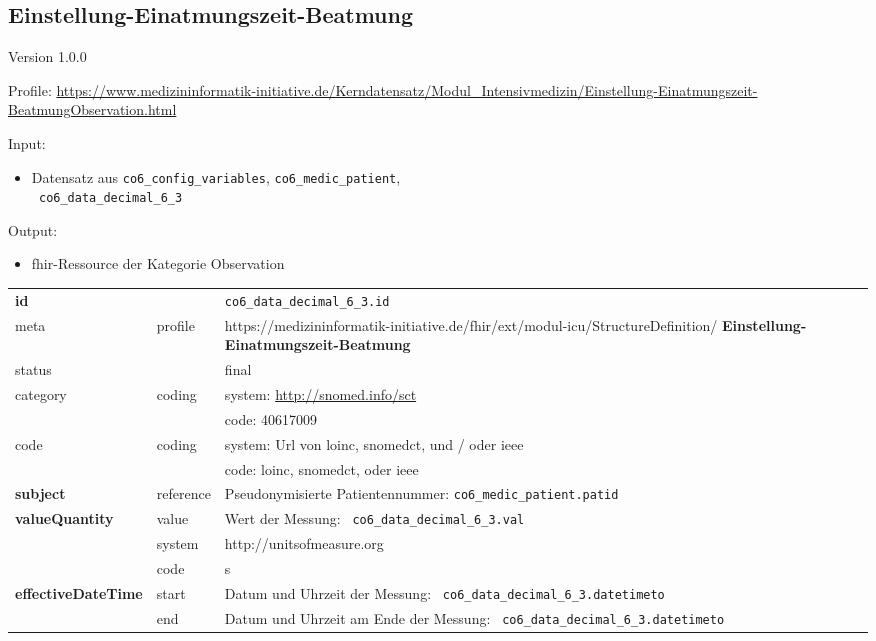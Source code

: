 \subsection{Einstellung-Einatmungszeit-Beatmung} 
\noindent Version 1.0.0

\noindent Profile: \url{https://www.medizininformatik-initiative.de/Kerndatensatz/Modul_Intensivmedizin/Einstellung-Einatmungszeit-BeatmungObservation.html}

\noindent Input:
\begin{itemize}
	\item Datensatz aus \texttt{co6\_config\_variables}, \texttt{co6\_medic\_patient}, \\ \texttt{
co6\_data\_decimal\_6\_3}
\end{itemize}
Output:
\begin{itemize}
        \item \ac{fhir}-Ressource der Kategorie \glqq Observation\grqq{}
\end{itemize}
\begin{longtable}{|l|l|p{7.5cm}|}
        \hline
        \rowcolor{lightgray} \multicolumn{3}{|l|}{Data Mapping (inhaltlich)} \\ \hline
        \textbf{id} &  & \texttt{co6\_data\_decimal\_6\_3.id} \\ \hline
	meta & profile & https://medizininformatik-initiative.de/fhir/ext/modul-icu/StructureDefinition/\textbf{
Einstellung-Einatmungszeit-Beatmung} \\ \hline 
	status &  & final   \\ \hline 
	category & coding & system: \url{http://snomed.info/sct} \\
\cline{3-3}
	& & code: 40617009\\ \hline
	code & coding & system: Url von \ac{loinc}, \ac{snomedct}, und / oder \ac{ieee} \\ 
	\cline{3-3} 
	 &  & code: \ac{loinc}, \ac{snomedct}, oder \ac{ieee} \\ \hline
	 \textbf{subject}  & reference & Pseudonymisierte Patientennummer: \texttt{co6\_medic\_patient.patid} \\ \hline
	 \textbf{valueQuantity}  & value & Wert der Messung: \texttt{
co6\_data\_decimal\_6\_3.val} \\
        \cline{2-3}
         & system & http://unitsofmeasure.org \\
         \cline{2-3}
         & code &
s
\\ \hline
     \textbf{effectiveDateTime}  & start & Datum und Uhrzeit der Messung: \texttt{
co6\_data\_decimal\_6\_3.datetimeto} \\
    \cline{2-3}
     & end & Datum und Uhrzeit am Ende der Messung: \texttt{
co6\_data\_decimal\_6\_3.datetimeto} \\ \hline
\end{longtable}

